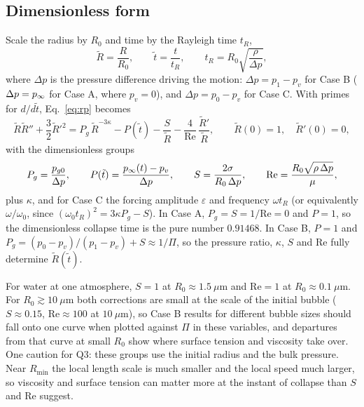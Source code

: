 \subsection{Dimensionless form}\label{sec:nondim}

Scale the radius by $R_0$ and time by the Rayleigh time $t_R$,
\begin{equation}
  \tilde R = \frac{R}{R_0}, \qquad \tilde t = \frac{t}{t_R}, \qquad
  t_R = R_0\sqrt{\frac{\rho}{\Delta p}},
\end{equation}
where $\Delta p$ is the pressure difference driving the motion: $\Delta p = p_1 - p_v$ for
Case B ($\Delta p = p_\infty$ for Case A, where $p_v = 0$), and $\Delta p = p_0 - p_v$ for
Case C. With primes for $d/d\tilde t$, Eq.~\eqref{eq:rp} becomes
\begin{equation}\label{eq:rp-nondim}
  \tilde R\tilde R'' + \frac{3}{2}\tilde R'^2
  = P_g\,\tilde R^{-3\kappa} - P(\tilde t) - \frac{S}{\tilde R}
    - \frac{4}{\mathrm{Re}}\,\frac{\tilde R'}{\tilde R},
  \qquad \tilde R(0) = 1,\quad \tilde R'(0) = 0,
\end{equation}
with the dimensionless groups
\begin{equation}
  P_g = \frac{p_{g0}}{\Delta p}, \qquad
  P(\tilde t) = \frac{p_\infty(t) - p_v}{\Delta p}, \qquad
  S = \frac{2\sigma}{R_0\,\Delta p}, \qquad
  \mathrm{Re} = \frac{R_0\sqrt{\rho\,\Delta p}}{\mu},
\end{equation}
plus $\kappa$, and for Case C the forcing amplitude $\varepsilon$ and frequency
$\omega t_R$ (or equivalently $\omega/\omega_0$, since $(\omega_0 t_R)^2 = 3\kappa P_g - S$).
In Case A, $P_g = S = 1/\mathrm{Re} = 0$ and $P = 1$, so the dimensionless collapse time is
the pure number $0.91468$. In Case B, $P = 1$ and
$P_g = (p_0 - p_v)/(p_1 - p_v) + S \approx 1/\Pi$, so the pressure ratio, $\kappa$, $S$ and
$\mathrm{Re}$ fully determine $\tilde R(\tilde t)$.

For water at one atmosphere, $S = 1$ at $R_0 \approx 1.5\ \mu\mathrm{m}$ and
$\mathrm{Re} = 1$ at $R_0 \approx 0.1\ \mu\mathrm{m}$. For $R_0 \gtrsim 10\ \mu\mathrm{m}$ both
corrections are small at the scale of the initial bubble ($S \approx 0.15$,
$\mathrm{Re} \approx 100$ at $10\ \mu\mathrm{m}$), so Case B results for different bubble sizes
should fall onto one curve when plotted against $\Pi$ in these variables, and departures
from that curve at small $R_0$ show where surface tension and viscosity take over. One
caution for Q3: these groups use the initial radius and the bulk pressure. Near $R_{\min}$
the local length scale is much smaller and the local speed much larger, so viscosity and
surface tension can matter more at the instant of collapse than $S$ and $\mathrm{Re}$ suggest.

